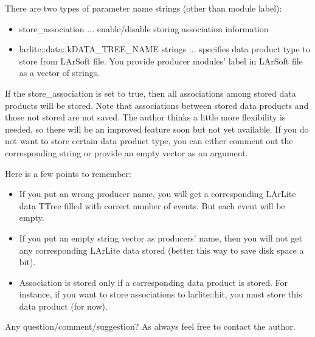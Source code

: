 There are two types of parameter name strings (other than module label):
\begin{itemize}
    \item {\ttfamily store\_association} $\ldots$ enable/disable storing association information
    \item {\ttfamily larlite::data::kDATA\_TREE\_NAME} strings $\ldots$ specifies data product type to store from LArSoft file. You provide producer modules' label in LArSoft file as a vector of strings.
\end{itemize}
If the {\ttfamily store\_association} is set to {\ttfamily true}, then all associations among stored data products will be stored. Note that associations between stored data products and those not stored are not saved. The author thinks a little more flexibility is needed, so there will be an improved feature soon but not yet available.
If you do not want to store certain data product type, you can either comment out the corresponding string or provide an empty vector as an argument.

Here is a few points to remember:
\begin{itemize}
\item If you put an wrong producer name, you will get a corresponding LArLite data {\ttfamily TTree} filled with correct number of events. But each event will be empty.
\item If you put an empty string vector as producers' name, then you will not get any corresponding LArLite data stored (better this way to save disk space a bit).
\item Association is stored only if a corresponding data product is stored. For instance, if you want to store associations to {\ttfamily larlite::hit}, you must store this data product (for now).
\end{itemize}

Any question/comment/suggestion? As always feel free to contact the author.

